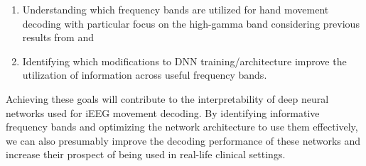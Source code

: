 \begin{enumerate}
    \item Understanding which frequency bands are utilized for hand movement decoding with particular focus on the high-gamma band considering previous results from \cite{Hammer-2021} and \cite{schirrmeister-deep-2017} 
    \item Identifying which modifications to DNN training/architecture improve the utilization of information across useful frequency bands.
\end{enumerate}

Achieving these goals will contribute to the interpretability of deep neural networks used for iEEG movement decoding.
By identifying informative frequency bands and optimizing the network architecture to use them effectively, we can also presumably improve the decoding performance of these networks and increase their prospect of being used in real-life clinical settings.

